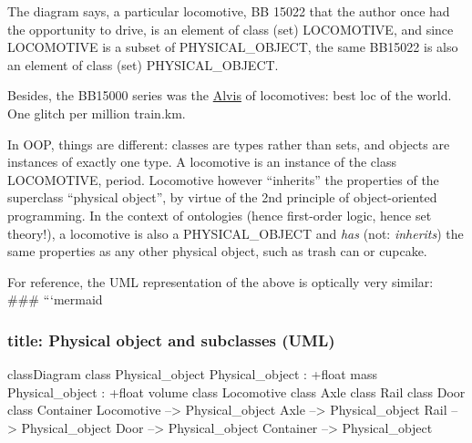 \documentclass[
  11pt,
]{article}
\begin{document}
The diagram says, a particular locomotive, BB 15022 that the author once
had the opportunity to drive, is an element of class (set) LOCOMOTIVE,
and since LOCOMOTIVE is a subset of PHYSICAL\_OBJECT, the same BB15022
is also an element of class (set) PHYSICAL\_OBJECT.

Besides, the BB15000 series was the
\href{https://thecritic.co.uk/issues/august-september-2023/a-car-for-the-connoisseur/}{Alvis}
of locomotives: best loc of the world. One glitch per million train.km.

In OOP, things are different: classes are types rather than sets, and
objects are instances of exactly one type. A locomotive is an instance
of the class LOCOMOTIVE, period. Locomotive however ``inherits'' the
properties of the superclass ``physical object'', by virtue of the 2nd
principle of object-oriented programming. In the context of ontologies
(hence first-order logic, hence set theory!), a locomotive is also a
PHYSICAL\_OBJECT and \emph{has} (not: \emph{inherits}) the same
properties as any other physical object, such as trash can or cupcake.

For reference, the UML representation of the above is optically very
similar: \#\#\# ```mermaid

\hypertarget{title-physical-object-and-subclasses-uml}{%
\subsubsection{title: Physical object and subclasses
(UML)}\label{title-physical-object-and-subclasses-uml}}

classDiagram class Physical\_object Physical\_object : +float mass
Physical\_object : +float volume class Locomotive class Axle class Rail
class Door class Container Locomotive --\textbar\textgreater{}
Physical\_object Axle --\textbar\textgreater{} Physical\_object Rail
--\textbar\textgreater{} Physical\_object Door --\textbar\textgreater{}
Physical\_object Container --\textbar\textgreater{} Physical\_object
\end{document}
